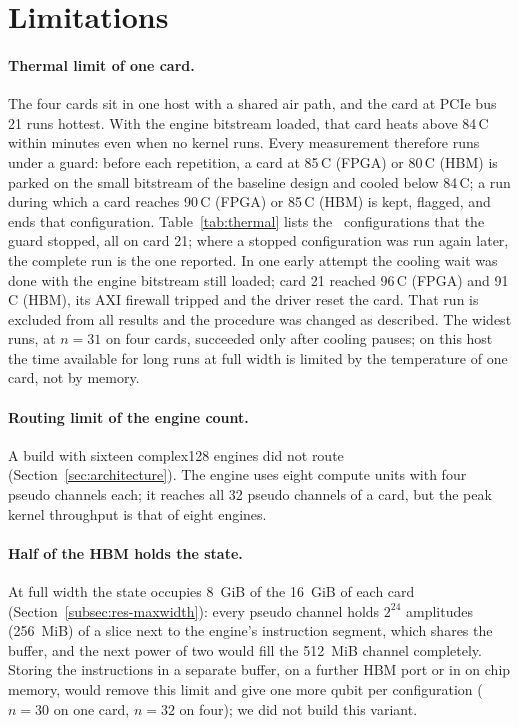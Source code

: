 \section{Limitations}\label{sec:limitations}

\paragraph{Thermal limit of one card.} The four cards sit in one host with a shared air path, and the card at PCIe
bus 21 runs hottest. With the engine bitstream loaded, that card heats above 84\,\textdegree C within minutes even
when no kernel runs. Every measurement therefore runs under a guard: before each repetition, a card at 85\,\textdegree C
(FPGA) or 80\,\textdegree C (HBM) is parked on the small bitstream of the baseline design and cooled below
84\,\textdegree C; a run during which a card reaches 90\,\textdegree C (FPGA) or 85\,\textdegree C (HBM) is kept,
flagged, and ends that configuration. Table~\ref{tab:thermal} lists the \NumThermalStops~configurations that the guard
stopped, all on card 21; where a stopped configuration was run again later, the complete run is the one reported. In one early attempt the cooling wait was done
with the engine bitstream still loaded; card 21 reached 96\,\textdegree C (FPGA) and 91\,\textdegree C (HBM), its AXI
firewall tripped and the driver reset the card. That run is excluded from all results and the procedure was changed
as described. The widest runs, at $n=31$ on four cards, succeeded only after cooling pauses; on this host the time
available for long runs at full width is limited by the temperature of one card, not by memory.

\paragraph{Routing limit of the engine count.} A build with sixteen complex128 engines did not route
(Section~\ref{sec:architecture}). The engine uses eight compute units with four pseudo channels each; it reaches
all 32 pseudo channels of a card, but the peak kernel throughput is that of eight engines.

\paragraph{Half of the HBM holds the state.} At full width the state occupies 8~GiB of the 16~GiB of each card
(Section~\ref{subsec:res-maxwidth}): every pseudo channel holds $2^{24}$ amplitudes (256~MiB) of a slice next to the
engine's instruction segment, which shares the buffer, and the next power of two would fill the 512~MiB channel
completely. Storing the instructions in a separate buffer, on a further HBM port or in on chip memory, would remove this
limit and give one more qubit per configuration ($n=30$ on one card, $n=32$ on four); we did not build this variant.

